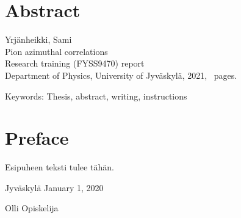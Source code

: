 \documentclass[final]{thesis} %
\title{\thesisname}
\author{Sami Yrjänheikki}
\date{XX.XX.2021}
\newcommand{\thesisname}{Pion azimuthal correlations}
\begin{document}
\titleJYFL


\section*{Abstract}

\begin{singlespace}
	Yrjänheikki, Sami\\
	\thesisname \\
	Research training (FYSS9470) report \\
	Department of Physics, University of Jyväskylä, 2021, \pageref{LastPage}~pages.
\end{singlespace}

\bigskip

\noindent \lipsum[1]

\bigskip 

\noindent Keywords: Thesis, abstract, writing, instructions

\section*{Preface}

Esipuheen teksti tulee tähän. \lipsum[1]

\bigskip

\noindent Jyväskylä January 1, 2020

\bigskip

\noindent Olli Opiskelija

\tableofcontents

\end{document}
